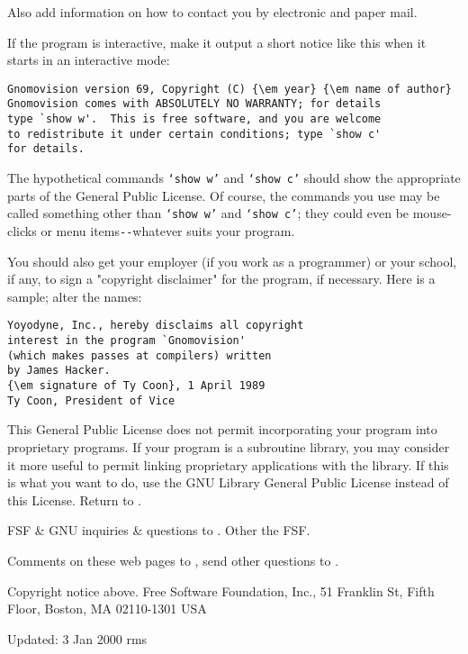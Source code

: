 Also add information on how to contact you by electronic and paper mail.

If the program is interactive, make it output a short notice like this when it
starts in an interactive mode:

\footnotesize
\begin{verbatim}
Gnomovision version 69, Copyright (C) {\em year} {\em name of author}
Gnomovision comes with ABSOLUTELY NO WARRANTY; for details
type `show w'.  This is free software, and you are welcome
to redistribute it under certain conditions; type `show c'
for details.
\end{verbatim}
\normalsize

The hypothetical commands {\tt `show w'} and {\tt `show c'} should show the
appropriate parts of the General Public License. Of course, the commands you
use may be called something other than {\tt `show w'} and {\tt `show c'}; they
could even be mouse-clicks or menu items\verb:--:whatever suits your program.

You should also get your employer (if you work as a programmer) or your
school, if any, to sign a "copyright disclaimer" for the program, if
necessary. Here is a sample; alter the names:

\footnotesize
\begin{verbatim}
Yoyodyne, Inc., hereby disclaims all copyright
interest in the program `Gnomovision'
(which makes passes at compilers) written
by James Hacker.
{\em signature of Ty Coon}, 1 April 1989
Ty Coon, President of Vice
\end{verbatim}
\normalsize

This General Public License does not permit incorporating your program into
proprietary programs. If your program is a subroutine library, you may
consider it more useful to permit linking proprietary applications with the
library. If this is what you want to do, use the GNU Library General Public
License instead of this License.
Return to
.

FSF \& GNU inquiries \& questions to
. Other
 the FSF.

Comments on these web pages to
, send other
questions to
.

Copyright notice above.
Free Software Foundation, Inc., 51 Franklin St, Fifth Floor,
Boston, MA  02110-1301  USA

Updated: 3 Jan 2000 rms
